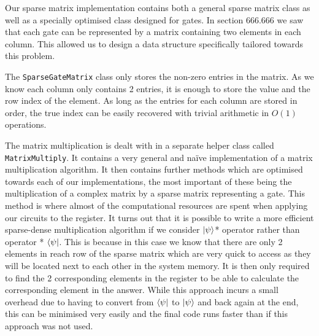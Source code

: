 \documentclass[bibliography=totocnumbered, 10pt]{article}
\theoremstyle{NoticeStyle}
\begin{document}
Our sparse matrix implementation contains both a general sparse matrix class as well as a specially optimised class designed for gates. In section 666.666 we saw that each gate can be represented by a matrix containing two elements in each column. This allowed us to design a data structure specifically tailored towards this problem.

The \texttt{SparseGateMatrix} class only stores the non-zero entries in the matrix. As we know each column only contains 2 entries, it is enough to store the value and the row index of the element. As long as the entries for each column are stored in order, the true index can be easily recovered with trivial arithmetic in $O(1)$ operations.

The matrix multiplication is dealt with in a separate helper class called \texttt{MatrixMultiply}. It contains a very general and naïve implementation of a matrix multiplication algorithm. It then contains further methods which are optimised towards each of our implementations, the most important of these being the multiplication of a complex matrix by a sparse matrix representing a gate. This method is where almost of the computational resources are spent when applying our circuits to the register. It turns out that it is possible to write a more efficient sparse-dense multiplication algorithm if we consider ${\left\vert{\psi}\right\rangle}$* operator rather than operator * ${\left\langle{\psi}\right\vert}$. This is because in this case we know that there are only 2 elements in reach row of the sparse matrix which are very quick to access as they will be located next to each other in the system memory. It is then only required to find the 2 corresponding elements in the register to be able to calculate the corresponding element in the answer. While this approach incurs a small overhead due to having to convert from ${\left\langle{\psi}\right\vert}$ to ${\left\vert{\psi}\right\rangle}$ and back again at the end, this can be minimised very easily and the final code runs faster than if this approach was not used.
\end{document}
